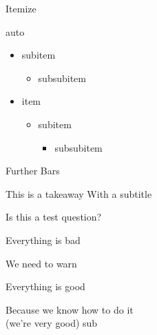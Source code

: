\documentclass[english,aspectratio=169,t,9pt]{beamer}
\begin{document}
\begin{frame}{Itemize}
\begin{cols}{auto}
\begin{comsyswhiteblock}{}
\begin{itemize}
\begin{itemize}
				\item subitem
					\begin{itemize}
					\item subsubitem
					\end{itemize}
				\end{itemize}
			\end{itemize}
		\end{comsyswhiteblock}
		\begin{comsysgrayblock}{}
			\begin{itemize}
			\item item
				\begin{itemize}
				\item subitem
					\begin{itemize}
					\item subsubitem
					\end{itemize}
				\end{itemize}
			\end{itemize}
		\end{comsysgrayblock}
	\end{cols}
\end{frame}

\begin{frame}{Further Bars}
	\begin{comsysyellowblock}
		This is a takeaway
		With a subtitle
	\end{comsysyellowblock}
	\begin{comsysyellowblock}[comsys/left icon=?]
		Is this a test question?
	\end{comsysyellowblock}
	\begin{comsysredblock}[comsys/right icon=\faThumbsDown]
		Everything is bad
	\end{comsysredblock}\vspace{-0.75ex}
	\begin{comsysredblock}[comsys/right icon=!]
		We need to warn
	\end{comsysredblock}
	\begin{comsysgreenblock}[comsys/right icon=\faThumbsUp]
		Everything is good
	\end{comsysgreenblock}
	\begin{comsysblueblock}[comsys/left icon=\faLightbulbO]
		Because we know how to do it \\ (we're very good)
		sub
	\end{comsysblueblock}
\end{frame}
\end{document}
